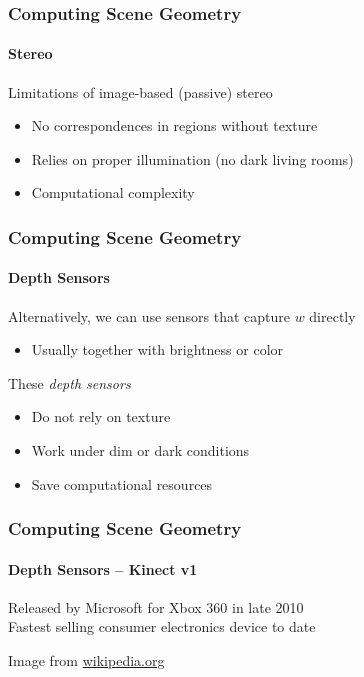 \documentclass[xetex,professionalfont]{beamer}
\begin{document}

\begin{frame}
\frametitle{Computing Scene Geometry}
\framesubtitle{Stereo}

Limitations of image-based (passive) stereo
\begin{itemize}
    \item No correspondences in regions without texture %
    \item Relies on proper illumination (no dark living rooms) %
    \item Computational complexity %
\end{itemize}

\end{frame}


\begin{frame}
\frametitle{Computing Scene Geometry}
\framesubtitle{Depth Sensors}

Alternatively, we can use sensors that capture $w$ directly
\begin{itemize}
    \item Usually together with brightness or color
\end{itemize}

\bigskip
These \emph{depth sensors}
\begin{itemize}
    \item Do not rely on texture
    \item Work under dim or dark conditions
    \item Save computational resources %
\end{itemize}

\end{frame}


\begin{frame}
\frametitle{Computing Scene Geometry}
\framesubtitle{Depth Sensors -- Kinect v1}

Released by Microsoft for Xbox 360 in late 2010\\\medskip
Fastest selling consumer electronics device to date %

\bigskip
\begin{center}
    {\centering Image from \url{wikipedia.org}}
\end{center}

\end{frame}
\end{document}
